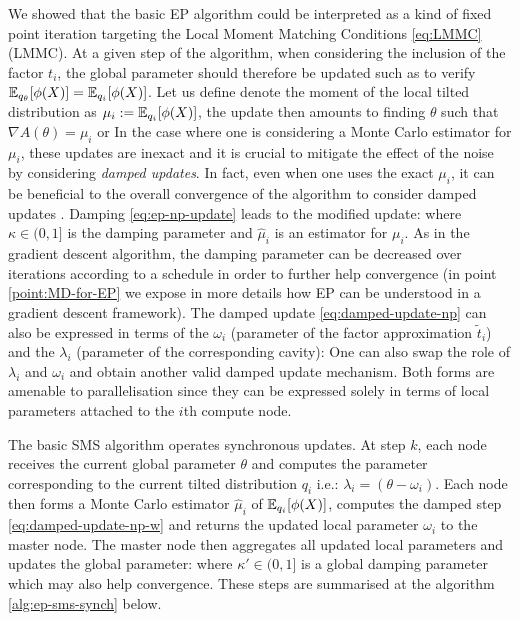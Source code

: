 We showed that the basic EP algorithm could be interpreted as a kind of fixed point iteration targeting the Local Moment Matching Conditions \eqref{eq:LMMC} (LMMC). At a given step of the algorithm, when considering the inclusion of the factor $t_i$, the global parameter should therefore be updated such as to verify $\mathbb E_{q_\theta}[\phi(X)]= \mathbb E_{q_i}[\phi(X)]$. Let us define denote the moment of the local tilted distribution as $\mu_i:=\mathbb E_{q_i}[\phi(X)]$, the update then amounts to finding $\theta$ such that $\nabla A(\theta) = \mu_i$ or
%
%
In the case where one is considering a Monte Carlo estimator for $\mu_i$, these updates are inexact and it is crucial to mitigate the effect of the noise by considering \emph{damped updates}. In fact, even when one uses the exact $\mu_i$, it can be beneficial to the overall convergence of the algorithm to consider damped updates \citep{heskes03}. Damping \eqref{eq:ep-np-update} leads to the modified update:
%
%
where $\kappa \in(0,1]$ is the damping parameter and $\hat\mu_i$ is an estimator for $\mu_i$. As in the gradient descent algorithm, the damping parameter can be decreased over iterations according to a schedule in order to further help convergence (in point \ref{point:MD-for-EP} we expose in more details how EP can be understood in a gradient descent framework).
The damped update \eqref{eq:damped-update-np} can also be expressed in terms of the $\omega_i$ (parameter of the factor approximation $\tilde t_i$) and the $\lambda_i$ (parameter of the corresponding cavity):
%
%
One can also swap the role of $\lambda_i$ and $\omega_i$ and obtain another valid damped update mechanism. Both forms are amenable to parallelisation since they can be expressed solely in terms of local parameters attached to the $i$th compute node.%

The basic SMS algorithm operates synchronous updates.
At step $k$, each node receives the current global parameter $\theta$ and computes the parameter corresponding to the current tilted distribution $q_i$ i.e.: $\lambda_i=(\theta-\omega_i)$. Each node then forms a Monte Carlo estimator $\hat\mu_i$ of $\mathbb E_{q_i}[\phi(X)]$, computes the damped step \eqref{eq:damped-update-np-w} and returns the updated local parameter $\omega_i$ to the master node. 
The master node then aggregates all updated local parameters and updates the global parameter: 
%
%
where $\kappa' \in (0,1]$ is a global damping parameter which may also help convergence. 
These steps are summarised at the algorithm \ref{alg:ep-sms-synch} below.

